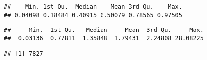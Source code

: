 \documentclass[
]{article}
\newenvironment{Shaded}{\begin{snugshade}}{\end{snugshade}}
\newcommand{\CommentTok}[1]{\textcolor[rgb]{0.56,0.35,0.01}{\textit{#1}}}
\newcommand{\DecValTok}[1]{\textcolor[rgb]{0.00,0.00,0.81}{#1}}
\newcommand{\KeywordTok}[1]{\textcolor[rgb]{0.13,0.29,0.53}{\textbf{#1}}}
\newcommand{\NormalTok}[1]{#1}
\newcommand{\OperatorTok}[1]{\textcolor[rgb]{0.81,0.36,0.00}{\textbf{#1}}}
\newcommand{\StringTok}[1]{\textcolor[rgb]{0.31,0.60,0.02}{#1}}
\begin{document}
\begin{verbatim}
##    Min. 1st Qu.  Median    Mean 3rd Qu.    Max. 
## 0.04098 0.18484 0.40915 0.50079 0.78565 0.97505
\end{verbatim}

\begin{Shaded}
\end{Shaded}

\begin{verbatim}
##     Min.  1st Qu.   Median     Mean  3rd Qu.     Max. 
##  0.03136  0.77811  1.35848  1.79431  2.24808 28.08225
\end{verbatim}

\begin{Shaded}
\end{Shaded}

\begin{verbatim}
## [1] 7827
\end{verbatim}
\end{document}
